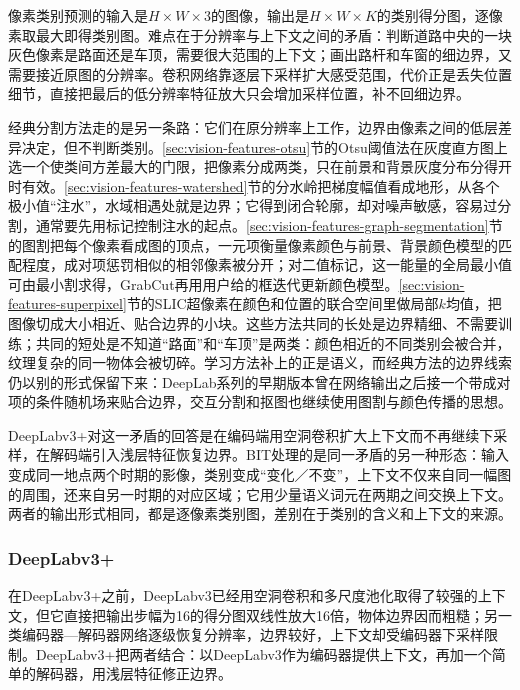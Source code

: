像素类别预测的输入是$H\times W\times3$的图像，输出是$H\times W\times K$的类别得分图，逐像素取最大即得类别图。难点在于分辨率与上下文之间的矛盾：判断道路中央的一块灰色像素是路面还是车顶，需要很大范围的上下文；画出路杆和车窗的细边界，又需要接近原图的分辨率。卷积网络靠逐层下采样扩大感受范围，代价正是丢失位置细节，直接把最后的低分辨率特征放大只会增加采样位置，补不回细边界。

经典分割方法走的是另一条路：它们在原分辨率上工作，边界由像素之间的低层差异决定，但不判断类别。\ref{sec:vision-features-otsu}节的Otsu阈值法在灰度直方图上选一个使类间方差最大的门限，把像素分成两类，只在前景和背景灰度分布分得开时有效。\ref{sec:vision-features-watershed}节的分水岭把梯度幅值看成地形，从各个极小值“注水”，水域相遇处就是边界；它得到闭合轮廓，却对噪声敏感，容易过分割，通常要先用标记控制注水的起点。\ref{sec:vision-features-graph-segmentation}节的图割把每个像素看成图的顶点，一元项衡量像素颜色与前景、背景颜色模型的匹配程度，成对项惩罚相似的相邻像素被分开；对二值标记，这一能量的全局最小值可由最小割求得，GrabCut再用用户给的框迭代更新颜色模型。\ref{sec:vision-features-superpixel}节的SLIC超像素在颜色和位置的联合空间里做局部$k$均值，把图像切成大小相近、贴合边界的小块。这些方法共同的长处是边界精细、不需要训练；共同的短处是不知道“路面”和“车顶”是两类：颜色相近的不同类别会被合并，纹理复杂的同一物体会被切碎。学习方法补上的正是语义，而经典方法的边界线索仍以别的形式保留下来：DeepLab系列的早期版本曾在网络输出之后接一个带成对项的条件随机场来贴合边界，交互分割和抠图也继续使用图割与颜色传播的思想。

DeepLabv3+对这一矛盾的回答是在编码端用空洞卷积扩大上下文而不再继续下采样，在解码端引入浅层特征恢复边界。BIT处理的是同一矛盾的另一种形态：输入变成同一地点两个时期的影像，类别变成“变化／不变”，上下文不仅来自同一幅图的周围，还来自另一时期的对应区域；它用少量语义词元在两期之间交换上下文。两者的输出形式相同，都是逐像素类别图，差别在于类别的含义和上下文的来源。

\subsubsection{DeepLabv3+}
\label{sec:vision-recognition-deeplab}

在DeepLabv3+之前，DeepLabv3已经用空洞卷积和多尺度池化取得了较强的上下文，但它直接把输出步幅为16的得分图双线性放大16倍，物体边界因而粗糙；另一类编码器—解码器网络逐级恢复分辨率，边界较好，上下文却受编码器下采样限制。DeepLabv3+把两者结合：以DeepLabv3作为编码器提供上下文，再加一个简单的解码器，用浅层特征修正边界。

